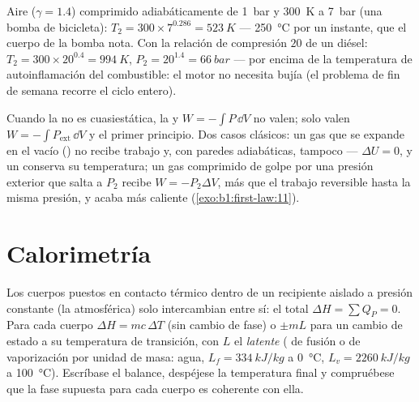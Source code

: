 \begin{example}\label{ex:b1:first-law:diesel}
Aire ($\gamma = 1.4$) comprimido adiabáticamente de \qty{1}{bar} y \qty{300}{K}
a \qty{7}{bar} (una bomba de bicicleta): $T_2 = 300 \times 7^{0.286} = \qty{523}{K}$
--- \qty{250}{\degreeCelsius} por un instante, que el cuerpo de la bomba
nota. Con la relación de compresión $20$ de un diésel:
$T_2 = 300 \times 20^{0.4} = \qty{994}{K}$,
$P_2 = 20^{1.4} = \qty{66}{bar}$ --- por encima de la temperatura de
autoinflamación del combustible: el motor no necesita bujía (el problema
de fin de semana recorre el ciclo entero).
\end{example}

\begin{remark}\label{rem:b1:first-law:irreversible}
Cuando la  no es cuasiestática, la  y $W =
-\int P\,\dd V$ no valen; solo valen $W = -\int P_{\mathrm{ext}}\,\dd V$ y el
primer principio. Dos casos clásicos: un gas que se expande en el vacío
() no recibe trabajo y, con paredes adiabáticas,
tampoco  --- $\Delta U
= 0$, y un  conserva su temperatura; un gas comprimido de
golpe por una presión exterior que salta a $P_2$ recibe $W = -P_2\Delta V$,
más que el trabajo reversible hasta la misma presión, y acaba más caliente
(\cref{exo:b1:first-law:11}).
\end{remark}

\section{Calorimetría}

\begin{method}\label{met:b1:first-law:calorimetry}
Los cuerpos puestos en contacto térmico dentro de un recipiente aislado a
presión constante (la atmosférica) solo intercambian  entre sí: el
total $\Delta H = \sum Q_P = 0$. Para cada cuerpo $\Delta H = mc\,\Delta T$
(sin cambio de fase) o $\pm mL$ para un cambio de estado a su temperatura
de transición, con $L$ el \emph{ latente} ( de fusión o de
vaporización por unidad de masa: agua, $L_f = \qty{334}{kJ/kg}$ a
\qty{0}{\degreeCelsius}, $L_v =
\qty{2260}{kJ/kg}$ a \qty{100}{\degreeCelsius}). Escríbase el balance,
despéjese la temperatura final y compruébese que la fase supuesta para
cada cuerpo es coherente con ella.
\end{method}

